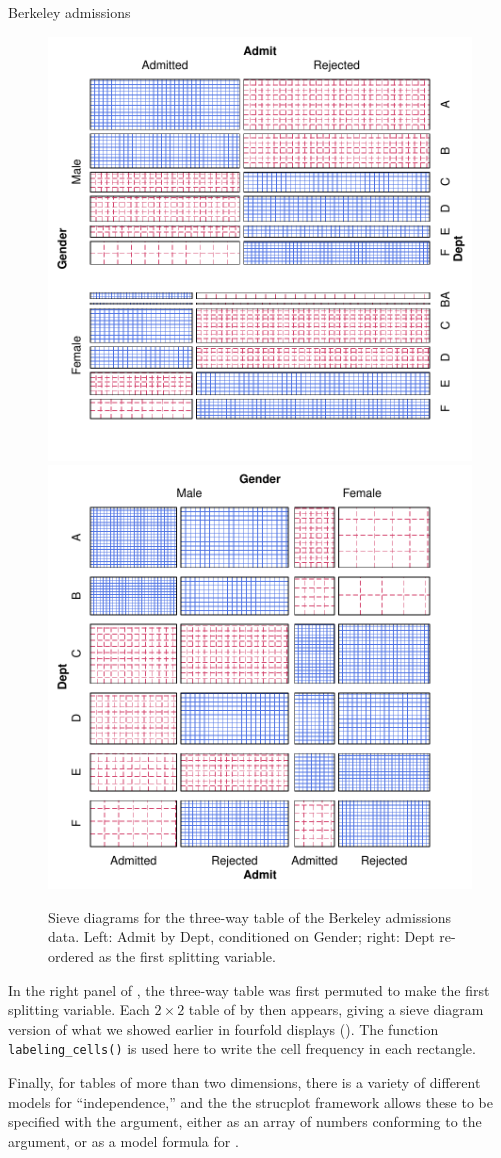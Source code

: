 \documentclass[11pt]{book}\usepackage[]{graphicx}\usepackage[]{color}
\newenvironment{knitrout}{}{} %
\renewenvironment{knitrout}{\small\renewcommand{\baselinestretch}{.85}}{} %
\begin{document}
\begin{Example}[berkeley3]{Berkeley admissions}
\begin{knitrout}
\begin{figure}[htbp]
\centerline{\includegraphics[width=.49\textwidth]{ch04/fig/berkeley-sieve1} 
\includegraphics[width=.49\textwidth]{ch04/fig/berkeley-sieve2} }

\caption[Sieve diagrams for the three-way table of the Berkeley admissions data]{Sieve diagrams for the three-way table of the Berkeley admissions data. Left: Admit by Dept, conditioned on Gender; right: Dept re-ordered as the first splitting variable.\label{fig:berkeley-sieve}}
\end{figure}


\end{knitrout}

In the right panel of , the three-way table
was first permuted to make  the first splitting variable.
Each $2 \times 2$ table of  by  then appears,
giving a sieve diagram version of what we showed earlier in 
fourfold displays (). 
The function \verb|labeling_cells()| is
used here to write the cell frequency in each rectangle.

Finally, for tables of more than two dimensions, there is a variety of
different models for ``independence,'' and the the strucplot framework 
allows these to be specified with the  argument,
either as an array of numbers conforming to the 
argument, or as a model formula for .


\end{Example}
\end{document}
